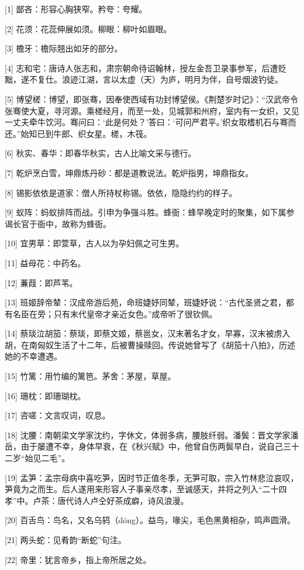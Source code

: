 \documentclass[12pt,UTF8]{ctexbook}
\begin{document}
[1] 鄙吝：形容心胸狭窄。矜夸：夸耀。

[2] 花须：花蕊伸展如须。柳眼：柳叶如眉眼。

[3] 檐牙：檐际翘出如牙的部分。

[4] 志和宅：唐诗人张志和，肃宗朝命待诏翰林，授左金吾卫录事参军，后遭贬黜，遂不复仕。浪迹江湖，言以太虚（天）为庐，明月为伴，自号烟波钓徒。

[5] 博望槎：博望，即张骞，因奉使西域有功封博望侯。《荆楚岁时记》：“汉武帝令张骞使大夏，寻河源。乘槎经月，而至一处，见城郭和州府，室内有一女织，又见一丈夫牵牛饮河。骞问曰：‘此是何处？’答曰：‘可问严君平。’织女取榰机石与骞而还。”始知已到牛郎、织女星。槎，木筏。

[6] 秋实、春华：即春华秋实，古人比喻文采与德行。

[7] 乾炉烹白雪，坤鼎炼丹砂：都是道教说法。乾炉指男，坤鼎指女。

[8] 锡影依依是道家：僧人所持杖称锡。依依，隐隐约约的样子。

[9] 蚁阵：蚂蚁排阵而战。引申为争强斗胜。蜂衙：蜂早晚定时的聚集，如下属参谒长官于衙中，故称为蜂衙。

[10] 宜男草：即萱草，古人以为孕妇佩之可生男。

[11] 益母花：中药名。

[12] 蒹葭：即芦苇。

[13] 班姬辞帝辇：汉成帝游后苑，命班婕妤同辇，班婕妤说：“古代圣贤之君，都有名臣在旁；只有末代皇帝才亲近女色。”成帝听了很钦佩。

[14] 蔡琰泣胡笳：蔡琰，即蔡文姬，蔡邕女，汉末著名才女，早寡，汉末被虏入胡，在南匈奴生活了十二年，后被曹操赎回。传说她曾写了《胡笳十八拍》，历述她的不幸遭遇。

[15] 竹篱：用竹编的篱笆。茅舍：茅屋，草屋。

[16] 珊枕：即珊瑚枕。

[17] 咨嗟：文言叹词，叹息。

[18] 沈腰：南朝梁文学家沈约，字休文，体弱多病，腰肢纤弱。潘鬓：晋文学家潘岳，由于屡遭不幸，身体早衰，在《秋兴赋》中，他曾自伤两鬓早白，说自己三十二岁“始见二毛”。

[19] 孟笋：孟宗母病中喜吃笋，因时节正值冬季，无笋可取，宗入竹林悲泣哀叹，笋竟为之而生。后人遂用来形容人子事亲尽孝，至诚感天，并将之列入“二十四孝”中。卢茶：唐代诗人卢仝好茶成癖，诗风浪漫。

[20] 百舌鸟：鸟名，又名乌鸫（dōng）。益鸟，喙尖，毛色黑黄相杂，鸣声圆滑。

[21] 两头蛇：见肴韵“断蛇”句注。

[22] 帝里：犹言帝乡，指上帝所居之处。
\end{document}

